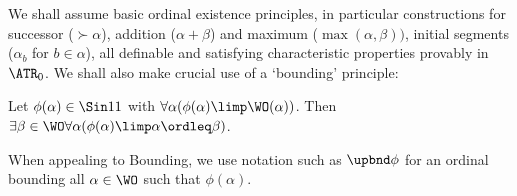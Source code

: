 
We shall assume basic ordinal existence principles, in particular constructions for successor ($\succ \alpha$), addition ($\alpha + \beta$) and maximum ($\max(\alpha,\beta))$, initial segments ($\alpha_b$ for $b\in \alpha$), all definable and satisfying characteristic properties provably in $\ATR_0$.
We shall also make crucial use of a `bounding' principle:
\begin{proposition}
    \label{prop:bounding}
    Let $\phi(\alpha) \in \Sin 1 1 $ with $\forall \alpha  (\phi(\alpha)\limp \WO(\alpha))$. 
    Then $\exists \beta \in \WO \forall \alpha (\phi(\alpha) \limp \alpha \ordleq \beta)$.
\end{proposition}
When appealing to Bounding, we use notation such as $\upbnd \phi$ for an ordinal bounding all $\alpha \in \WO$ such that $\phi(\alpha)$.







